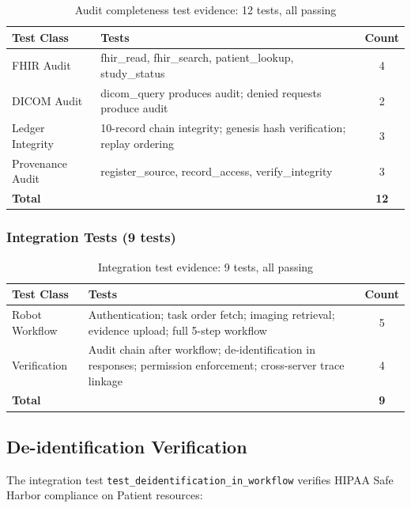 \documentclass[10pt,letterpaper]{article}
\begin{document}
\begin{table}[H]
\centering
\caption{Audit completeness test evidence: 12 tests, all passing}
\label{tab:audittests}
\small
\begin{tabularx}{\textwidth}{l X c}
\toprule
\textbf{Test Class} & \textbf{Tests} & \textbf{Count} \\
\midrule
FHIR Audit & fhir\_read, fhir\_search, patient\_lookup, study\_status & 4 \\
DICOM Audit & dicom\_query produces audit; denied requests produce audit & 2 \\
Ledger Integrity & 10-record chain integrity; genesis hash verification; replay ordering & 3 \\
Provenance Audit & register\_source, record\_access, verify\_integrity & 3 \\
\midrule
\textbf{Total} & & \textbf{12} \\
\bottomrule
\end{tabularx}
\end{table}

\subsubsection{Integration Tests (9 tests)}

\begin{table}[H]
\centering
\caption{Integration test evidence: 9 tests, all passing}
\label{tab:inttests}
\small
\begin{tabularx}{\textwidth}{l X c}
\toprule
\textbf{Test Class} & \textbf{Tests} & \textbf{Count} \\
\midrule
Robot Workflow & Authentication; task order fetch; imaging retrieval; evidence upload; full 5-step workflow & 5 \\
Verification & Audit chain after workflow; de-identification in responses; permission enforcement; cross-server trace linkage & 4 \\
\midrule
\textbf{Total} & & \textbf{9} \\
\bottomrule
\end{tabularx}
\end{table}

\subsection{De-identification Verification}

The integration test \texttt{test\_deidentification\_in\_workflow} verifies HIPAA Safe Harbor compliance on Patient resources:
\end{document}
